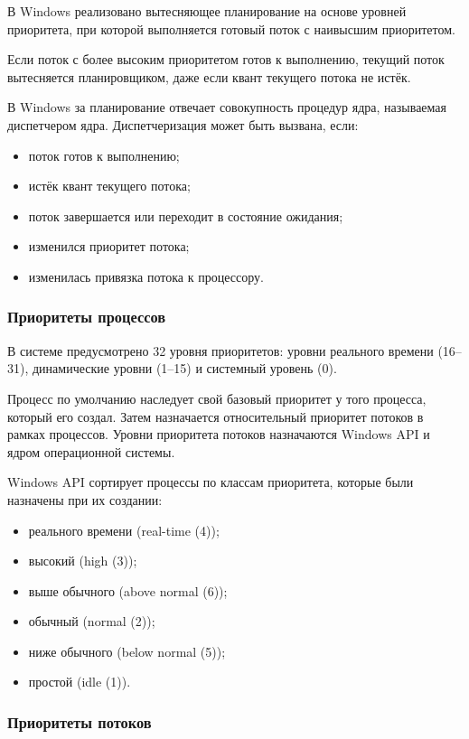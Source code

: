 В Windows реализовано вытесняющее планирование на основе уровней приоритета, при которой выполняется готовый поток с наивысшим приоритетом.

Если поток с более высоким приоритетом готов к выполнению, текущий поток вытесняется планировщиком, даже если квант текущего потока не истёк.

В Windows за планирование отвечает совокупность процедур ядра, называемая диспетчером ядра. Диспетчеризация может быть вызвана, если:

\begin{itemize}
\item поток готов к выполнению;
\item истёк квант текущего потока;
\item поток завершается или переходит в состояние ожидания;
\item изменился приоритет потока;
\item изменилась привязка потока к процессору.
\end{itemize}

\subsubsection*{Приоритеты процессов}

В системе предусмотрено 32 уровня приоритетов: уровни реального времени (16–31), динамические уровни (1–15) и системный уровень (0).

Процесс по умолчанию наследует свой базовый приоритет у того процесса, который его создал. Затем назначается относительный приоритет потоков в рамках процессов. Уровни приоритета потоков назначаются Windows API и ядром операционной системы.

Windows API сортирует процессы по классам приоритета, которые были назначены при их создании:

\begin{itemize}
	\item реального времени (real-time (4));
 	\item высокий (high (3));
	\item выше обычного (above normal (6));
	\item обычный (normal (2));
	\item ниже обычного (below normal (5));
	\item простой (idle (1)).
\end{itemize}

\subsubsection*{Приоритеты потоков}

